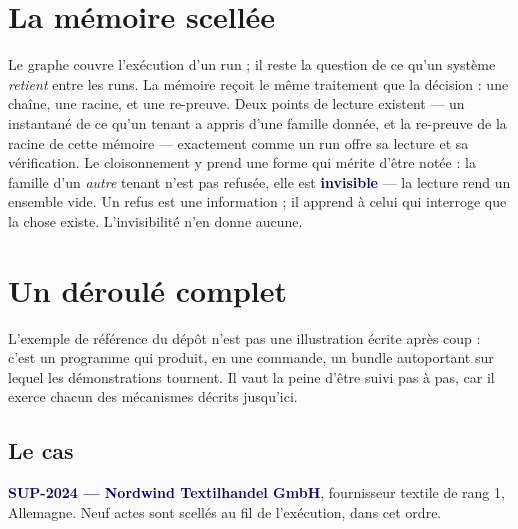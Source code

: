 \documentclass[10pt]{article}
\newcommand{\mm}[1]{\textbf{\textcolor{navy}{#1}}}
\begin{document}
\section{La mémoire scellée}

Le graphe couvre l'exécution d'un run ; il reste la question de ce qu'un système \emph{retient} entre les runs. La mémoire reçoit le même traitement que la décision : une chaîne, une racine, et une re-preuve. Deux points de lecture existent — un instantané de ce qu'un tenant a appris d'une famille donnée, et la re-preuve de la racine de cette mémoire — exactement comme un run offre sa lecture et sa vérification. Le cloisonnement y prend une forme qui mérite d'être notée : la famille d'un \emph{autre} tenant n'est pas refusée, elle est \mm{invisible} — la lecture rend un ensemble vide. Un refus est une information ; il apprend à celui qui interroge que la chose existe. L'invisibilité n'en donne aucune.

\section{Un déroulé complet}

L'exemple de référence du dépôt n'est pas une illustration écrite après coup : c'est un programme qui produit, en une commande, un bundle autoportant sur lequel les démonstrations tournent. Il vaut la peine d'être suivi pas à pas, car il exerce chacun des mécanismes décrits jusqu'ici.

\subsection{Le cas}

\mm{SUP-2024 — Nordwind Textilhandel GmbH}, fournisseur textile de rang 1, Allemagne. Neuf actes sont scellés au fil de l'exécution, dans cet ordre.
\end{document}
